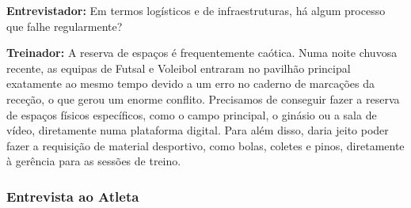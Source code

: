 \begin{tcolorbox}[colback=white, colframe=gray!50, arc=1mm, title=\textbf{Transcrição da Entrevista ao Treinador}]
\textbf{Entrevistador:} Em termos logísticos e de infraestruturas, há algum processo que falhe regularmente?

\textbf{Treinador:} A reserva de espaços é frequentemente caótica. Numa noite chuvosa recente, as equipas de Futsal e Voleibol entraram no pavilhão principal exatamente ao mesmo tempo devido a um erro no caderno de marcações da receção, o que gerou um enorme conflito. Precisamos de conseguir fazer a reserva de espaços físicos específicos, como o campo principal, o ginásio ou a sala de vídeo, diretamente numa plataforma digital. Para além disso, daria jeito poder fazer a requisição de material desportivo, como bolas, coletes e pinos, diretamente à gerência para as sessões de treino.
\end{tcolorbox}

\clearpage
\subsubsection*{Entrevista ao Atleta}


